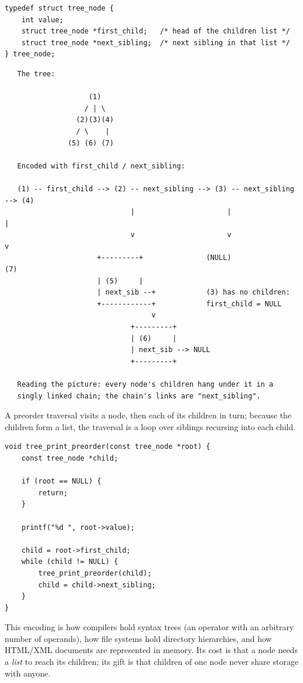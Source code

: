 \begin{lstlisting}[caption={The N-ary node: first child, next sibling.}]
typedef struct tree_node {
    int value;
    struct tree_node *first_child;   /* head of the children list */
    struct tree_node *next_sibling;  /* next sibling in that list */
} tree_node;
\end{lstlisting}

\begin{verbatim}
   The tree:

                    (1)
                   / | \
                 (2)(3)(4)
                 / \    |
               (5) (6) (7)

   Encoded with first_child / next_sibling:

   (1) -- first_child --> (2) -- next_sibling --> (3) -- next_sibling --> (4)
                              |                      |                    |
                              v                      v                    v
                      +---------+               (NULL)                  (7)
                      | (5)     |
                      | next_sib --+            (3) has no children:
                      +------------+            first_child = NULL
                                   v
                              +---------+
                              | (6)     |
                              | next_sib --> NULL
                              +---------+

   Reading the picture: every node's children hang under it in a
   singly linked chain; the chain's links are "next_sibling".
\end{verbatim}

A preorder traversal visits a node, then each of its children in turn;
because the children form a list, the traversal is a loop over siblings
recursing into each child.

\begin{lstlisting}[caption={Preorder traversal of an N-ary tree.}]
void tree_print_preorder(const tree_node *root) {
    const tree_node *child;

    if (root == NULL) {
        return;
    }

    printf("%d ", root->value);

    child = root->first_child;
    while (child != NULL) {
        tree_print_preorder(child);
        child = child->next_sibling;
    }
}
\end{lstlisting}

This encoding is how compilers hold syntax trees (an operator with an
arbitrary number of operands), how file systems hold directory
hierarchies, and how HTML/XML documents are represented in memory.
Its cost is that a node needs a \emph{list} to reach its children; its
gift is that children of one node never share storage with anyone.

